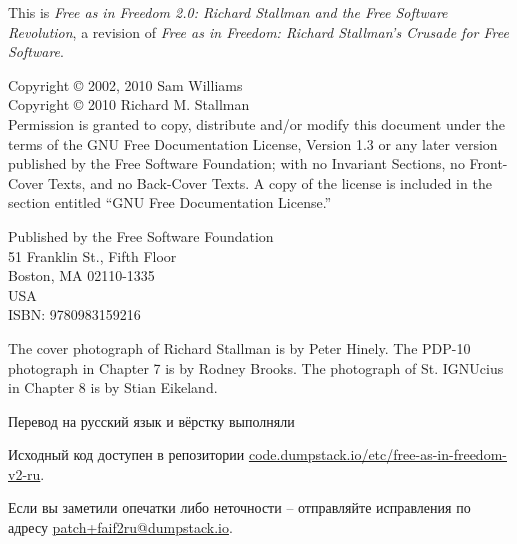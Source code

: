 \noindent This is \textit{Free as in Freedom 2.0: Richard Stallman and
  the Free Software Revolution}, a revision of \textit{Free as in
  Freedom: Richard Stallman's Crusade for Free Software}.

\bigskip

\noindent Copyright \copyright{} 2002, 2010 Sam Williams\\
Copyright \copyright{} 2010 Richard M. Stallman\\
Permission is granted to copy, distribute and/or modify
this document under the terms of the GNU Free Documentation License,
Version 1.3 or any later version published by the Free Software
Foundation; with no Invariant Sections, no Front-Cover Texts, and no
Back-Cover Texts. A copy of the license is included in the section
entitled ``GNU Free Documentation License.''

\bigskip

\noindent Published by the Free Software Foundation\\
51 Franklin St., Fifth Floor\\
Boston, MA 02110-1335\\
USA\\
ISBN: 9780983159216\\

\bigskip

\noindent The cover photograph of Richard Stallman is by Peter Hinely. The PDP-10 photograph in Chapter 7 is by Rodney Brooks. The photograph of St. IGNUcius in Chapter 8 is by Stian Eikeland. 

\bigskip

Перевод на русский язык и вёрстку выполняли 

Исходный код доступен в репозитории
\href{https://code.dumpstack.io/etc/free-as-in-freedom-v2-ru}{code.dumpstack.io/etc/free-as-in-freedom-v2-ru}.

Если вы заметили опечатки либо неточности -- отправляйте исправления по адресу
\href{mailto:patch+faif2ru@dumpstack.io}{patch+faif2ru@dumpstack.io}.
